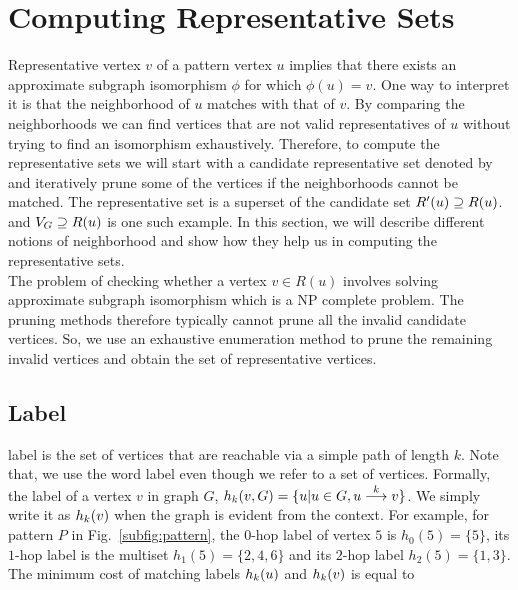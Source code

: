 
\section{Computing Representative Sets}
Representative vertex $v$ of a pattern vertex $u$ implies that there
exists an approximate subgraph isomorphism $\phi$ for which $\phi(u) = v$.
 One way to interpret it is that the neighborhood of $u$ matches with
 that of $v$.  By comparing the neighborhoods we can find 
 vertices that are not valid representatives of $u$ without trying to
 find an isomorphism exhaustively. Therefore, to compute the
 representative sets we will start with a candidate 
 representative set denoted by \CR  and iteratively
 prune some of the vertices if the neighborhoods cannot be matched.
 The representative set is a superset of the candidate set $\CR \supseteq \RS$.
 and $\vg \supseteq \RS$ is one such example.
  In this section, we will
 describe different notions of neighborhood and show how they
 help us in computing the representative
 sets. \\
The problem of checking whether a vertex $v \in R(u)$
 involves solving
 approximate subgraph isomorphism which is a NP complete
 problem. The pruning methods therefore 
 typically cannot prune all the invalid
 candidate vertices. 
 So, we use an exhaustive enumeration method to prune the remaining
invalid vertices and obtain the set of representative
vertices.

 \subsection{\khop Label}
 \khop label 
 is the set of vertices that are reachable via a simple
 path of length $k$. 
 Note that, we use the word label even though we refer to a set of vertices.
 Formally, the \khop label of a vertex
 $v$ in graph $G$, $\khopl{k}{v,G} = \{u | u \in G, \kpath{u}{v}{k}\}$.
 We simply write it as $\khopl{k}{v}$ when the graph is evident from
 the context. 
For example, for pattern $P$ in
Fig.~\ref{subfig:pattern}, the $0$-hop label of vertex $5$ is $h_0(5)
 = \{5\}$, its $1$-hop label is the multiset $h_1(5) = \{2, 4, 6\}$ 
 and its $2$-hop label $h_2(5) = \{1, 3\}$. The minimum 
 cost of matching \khop labels
 $\khopl{k}{u}$ and $\khopl{k}{v}$ is equal to 

